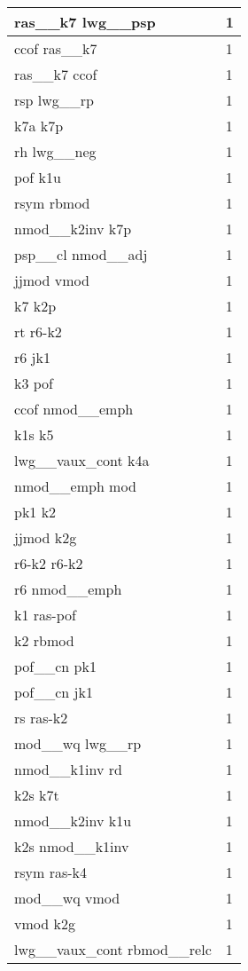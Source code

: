 \documentclass[a4 paper]{article}
\begin{document}
\begin{longtable}{p{}p{}}
ras\_\_k7 lwg\_\_psp  & 1 \\ \midrule
ccof ras\_\_k7  & 1 \\ \midrule
ras\_\_k7 ccof  & 1 \\ \midrule
rsp lwg\_\_rp  & 1 \\ \midrule
k7a k7p  & 1 \\ \midrule
rh lwg\_\_neg  & 1 \\ \midrule
pof k1u  & 1 \\ \midrule
rsym rbmod  & 1 \\ \midrule
nmod\_\_k2inv k7p  & 1 \\ \midrule
psp\_\_cl nmod\_\_adj  & 1 \\ \midrule
jjmod vmod  & 1 \\ \midrule
k7 k2p  & 1 \\ \midrule
rt r6-k2  & 1 \\ \midrule
r6 jk1  & 1 \\ \midrule
k3 pof  & 1 \\ \midrule
ccof nmod\_\_emph  & 1 \\ \midrule
k1s k5  & 1 \\ \midrule
lwg\_\_vaux\_cont k4a  & 1 \\ \midrule
nmod\_\_emph mod  & 1 \\ \midrule
pk1 k2  & 1 \\ \midrule
jjmod k2g  & 1 \\ \midrule
r6-k2 r6-k2  & 1 \\ \midrule
r6 nmod\_\_emph  & 1 \\ \midrule
k1 ras-pof  & 1 \\ \midrule
k2 rbmod  & 1 \\ \midrule
pof\_\_cn pk1  & 1 \\ \midrule
pof\_\_cn jk1  & 1 \\ \midrule
rs ras-k2  & 1 \\ \midrule
mod\_\_wq lwg\_\_rp  & 1 \\ \midrule
nmod\_\_k1inv rd  & 1 \\ \midrule
k2s k7t  & 1 \\ \midrule
nmod\_\_k2inv k1u  & 1 \\ \midrule
k2s nmod\_\_k1inv  & 1 \\ \midrule
rsym ras-k4  & 1 \\ \midrule
mod\_\_wq vmod  & 1 \\ \midrule
vmod k2g  & 1 \\ \midrule
lwg\_\_vaux\_cont rbmod\_\_relc  & 1 \\ \midrule

\end{longtable}
\end{document}

